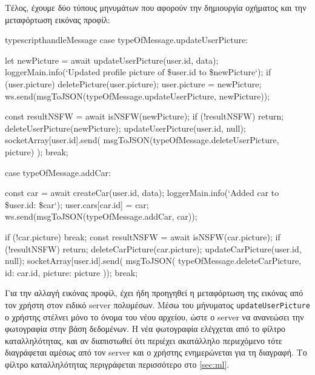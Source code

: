 \documentclass[../thesis.tex]{subfiles}
\begin{document}
\bigskip

Τέλος, έχουμε δύο τύπους μηνυμάτων που αφορούν την δημιουργία οχήματος και την μεταφόρτωση εικόνας προφίλ:

\begin{codeblock}{typescript}{handleMessage}
  case typeOfMessage.updateUserPicture: {
    let newPicture = await updateUserPicture(user.id, data);
    loggerMain.info(`Updated profile picture of \${user.id} to \${newPicture}`);
    if (user.picture) deletePicture(user.picture);
    user.picture = newPicture;
    ws.send(msgToJSON(typeOfMessage.updateUserPicture, newPicture));

    const resultNSFW = await isNSFW(newPicture);
    if (!resultNSFW) return;
    deleteUserPicture(newPicture);
    updateUserPicture(user.id, null);
    socketArray[user.id].send(
      msgToJSON(typeOfMessage.deleteUserPicture, picture)
    );
    break;
  }
  case typeOfMessage.addCar: {
    const car = await createCar(user.id, data);
    loggerMain.info(`Added car to \${user.id}: \${car}`);
    user.cars[car.id] = car;
    ws.send(msgToJSON(typeOfMessage.addCar, car));

    if (!car.picture) break;
    const resultNSFW = await isNSFW(car.picture);
    if (!resultNSFW) return;
    deleteCarPicture(car.picture);
    updateCarPicture(user.id, null);
    socketArray[user.id].send(
      msgToJSON(
        typeOfMessage.deleteCarPicture,
        {id: car.id, picture: picture}
    ));
    break;
  }
\end{codeblock}

Για την αλλαγή εικόνας προφίλ, έχει ήδη προηγηθεί η μεταφόρτωση της εικόνας από τον χρήστη στον ειδικό server πολυμέσων.
Μέσω του μήνυματος \texttt{update\-User\-Picture} ο χρήστης στέλνει μόνο το όνομα του νέου αρχείου, ώστε ο server να ανανεώσει την φωτογραφία στην βάση δεδομένων.
Η νέα φωτογραφία ελέγχεται από το φίλτρο καταλληλότητας, και αν διαπιστωθεί ότι περιέχει ακατάλληλο περιεχόμενο τότε διαγράφεται αμέσως από τον server και ο χρήστης ενημερώνεται για τη διαγραφή.
Το φίλτρο καταλληλότητας περιγράφεται περισσότερο στο \autoref{sec:ml}.
\end{document}
